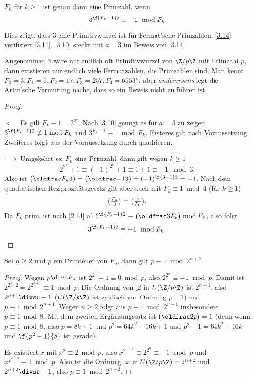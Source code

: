 \begin{st} \label{3.14}
	$F_k$ für $k \ge 1$ ist genau dann eine Primzahl, wenn
	\[
		3^{\f{F_k - 1}2} \equiv -1 \mod F_k
	\]
	\begin{note}
		Dies zeigt, dass $3$ eine Primitivwurzel ist für Fermat'sche Primzahlen.
		\ref{3.14} verifiziert \ref{3.11}.
		\ref{3.10} steckt mit $a = 3$ im Beweis von \ref{3.14}.

		Angenommen $3$ wäre nur endlich oft Primitivwurzel von $\Z / p\Z$ mit Primzahl $p$, dann existieren nur endlich viele Fermatzahlen, die Primzahlen sind.
		Man kennt $F_0 = 3, F_1 = 5, F_2 = 17, F_3 = 257, F_4 = 65537$, aber \emph{andererseits} legt die Artin'sche Vermutung nache, dass so ein Beweis nicht zu führen ist.
	\end{note}
	\begin{proof}
		\begin{segnb}{$\impliedby$}
			Es gilt $F_k - 1 = 2^{2^k}$.
			Nach \ref{3.10} genügt es für $a = 3$ zu zeigen $3^{\f{F_k - 1}2} \not\equiv 1 \bmod F_k$ und $3^{F_k-1} \equiv 1 \bmod F_k$.
			Ersteres gilt nach Voraussetzung.
			Zweiteres folgt aus der Voraussetzung durch quadrieren.
		\end{segnb}
		\begin{segnb}{$\implies$}
			Umgekehrt sei $F_k$ eine Primzahl, dann gilt wegen $k \ge 1$
			\[
				2^{2^k} + 1
				\equiv (-1)^{2^k} + 1
				\equiv 1 + 1
				\equiv -1
				\mod 3.
			\]
			Also ist $\legsym{F_k}{3} = \legsym{-1}{3} = (-1)^{\f{3-1}2} = -1$.
			Nach dem quadratischen Reziprozitätsgesetz gilt aber auch mit $F_k \equiv 1 \bmod 4$ (für $k \ge 1$)
			\[
				\legsym{F_k}{3}
				= \legsym{3}{F_k}.
			\]
			Da $F_k$ prim, ist nach \ref{2.14} a) $3^{\f{F_k - 1}2} \equiv \legsym{3}{F_k} \bmod F_k$, also folgt
			\[
				3^{\f{F_k-1}2} \equiv -1 \mod F_k.
			\]
		\end{segnb}
	\end{proof}
\end{st}

\begin{st} \label{3.15}
	Sei $n \ge 2$ und $p$ ein Primteiler von $F_n$, dann gilt $p \equiv 1 \bmod 2^{n+2}$.
	\begin{proof}
		Wegen $p \divs F_n$ ist $2^{2^n} + 1 \equiv 0 \bmod p$, also $2^{2^n} \equiv - 1 \bmod p$.
		Damit ist $2^{2^n \cdot 2} = 2^{2^{n+1}} \equiv 1 \bmod p$.
		Die Ordnung von $\_ 2$ in $U(\Z / p\Z)$ ist $2^{n+1}$, also $2^{n+1} \divs p - 1$ ($U(\Z / p\Z)$ ist zyklisch von Ordnung $p-1$) und $p \equiv 1 \bmod 2^{n+1}$.
		Wegen $n \ge 2$ folgt aus $p \equiv 1 \bmod 2^{n+1}$ insbesondere $p \equiv 1 \bmod 8$.
		Mit dem zweiten Ergänzungssatz ist $\legsym{2}{p} = 1$ (denn wenn $p \equiv 1 \bmod 8$, also $p = 8k + 1$ und $p^2 = 64k^2 + 16k + 1$ und $p^2 - 1 = 64k^2 + 16k$ und $\f{p^2 - 1}{8}$ ist gerade).

		Es existiert $x$ mit $x^2 \equiv 2 \bmod p$, also $x^{2^{n+1}} \equiv 2^{2^n} \equiv -1 \bmod p$ und $x^{2^{n+2}} \equiv 1 \bmod p$.
		Also ist die Ordnung $\_ x$ in $U(\Z / p\Z) = 2^{n+2}$ und $2^{n+2} \divs p-1$, also $p \equiv 1 \bmod 2^{n+2}$.
	\end{proof}
\end{st}

